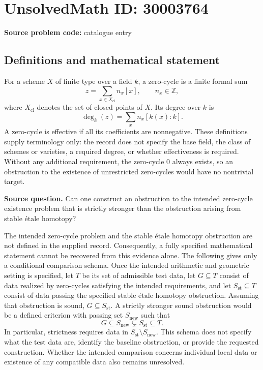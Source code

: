 \documentclass[11pt]{article}
\newcommand{\Z}{\mathbb{Z}}
\begin{document}
\section*{UnsolvedMath ID: 30003764}
\textbf{Source problem code:} catalogue entry
\subsection{Definitions and mathematical statement}
For a scheme \(X\) of finite type over a field \(k\), a zero-cycle is a finite formal sum
\[
z=\sum_{x\in X_{\mathrm{cl}}}n_x[x],\qquad n_x\in\Z,
\]
where \(X_{\mathrm{cl}}\) denotes the set of closed points of \(X\). Its degree over \(k\) is
\[
\deg_k(z)=\sum_x n_x[k(x):k].
\]
A zero-cycle is effective if all its coefficients are nonnegative. These definitions supply terminology only: the record does not specify the base field, the class of schemes or varieties, a required degree, or whether effectiveness is required. Without any additional requirement, the zero-cycle \(0\) always exists, so an obstruction to the existence of unrestricted zero-cycles would have no nontrivial target.

\textbf{Source question.} Can one construct an obstruction to the intended zero-cycle existence problem that is strictly stronger than the obstruction arising from stable \(\text{\'etale}\) homotopy?

The intended zero-cycle problem and the stable \(\text{\'etale}\) homotopy obstruction are not defined in the supplied record. Consequently, a fully specified mathematical statement cannot be recovered from this evidence alone. The following gives only a conditional comparison schema. Once the intended arithmetic and geometric setting is specified, let \(T\) be its set of admissible test data, let \(G\subseteq T\) consist of data realized by zero-cycles satisfying the intended requirements, and let \(S_{\mathrm{st}}\subseteq T\) consist of data passing the specified stable \(\text{\'etale}\) homotopy obstruction. Assuming that obstruction is sound, \(G\subseteq S_{\mathrm{st}}\). A strictly stronger sound obstruction would be a defined criterion with passing set \(S_{\mathrm{new}}\) such that
\[
G\subseteq S_{\mathrm{new}}\subsetneq S_{\mathrm{st}}\subseteq T.
\]
In particular, strictness requires data in \(S_{\mathrm{st}}\setminus S_{\mathrm{new}}\). This schema does not specify what the test data are, identify the baseline obstruction, or provide the requested construction. Whether the intended comparison concerns individual local data or existence of any compatible data also remains unresolved.
\end{document}
